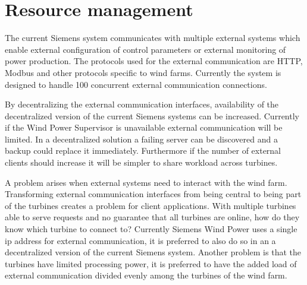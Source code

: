 \section{Resource management} %
\label{cha:resourceManagement}

The current Siemens system communicates with multiple external systems which enable external configuration of control parameters or external monitoring of power production. The protocols used for the external communication are HTTP, Modbus and other protocols specific to wind farms. Currently the system is designed to handle 100 concurrent external communication connections.

By decentralizing the external communication interfaces, availability of the decentralized version of the current Siemens systems can be increased. Currently if the Wind Power Supervisor is unavailable external communication will be limited. In a decentralized solution a failing server can be discovered and a backup could replace it immediately. Furthermore if the number of external clients should increase it will be simpler to share workload across turbines.

A problem arises when external systems need to interact with the wind farm. 
Transforming external communication interfaces from being central to being part of the turbines creates a problem for client applications.
With multiple turbines able to serve requests and no guarantee that all turbines are online, how do they know which turbine to connect to?
Currently Siemens Wind Power uses a single ip address for external communication, it is preferred to also do so in an a decentralized version of the current Siemens system.
Another problem is that the turbines have limited processing power, it is preferred to have the added load of external communication divided evenly among the turbines of the wind farm.


